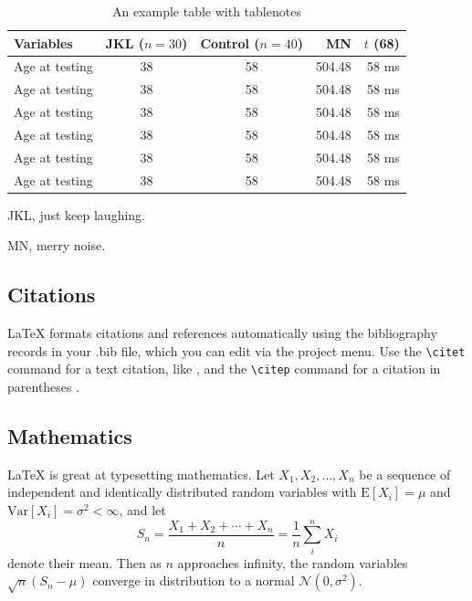 \documentclass{article}
\begin{document}
\begin{table}[hbt!]\centering
\begin{threeparttable}
\caption{An example table with tablenotes}\label{tab:withnotes}

\begin{tabular}{lccrr}
\toprule
Variables & JKL ($n=30$) & Control ($n=40$) & MN & $t$ (68)\\
\midrule
Age at testing & 38 & 58\tnote{1} & 504.48 & 58 ms\\
Age at testing & 38 & 58 & 504.48 & 58 ms\\
Age at testing & 38 & 58 & 504.48 & 58 ms\\
Age at testing & 38 & 58 & 504.48 & 58 ms\\
Age at testing\tnote{2} & 38 & 58 & 504.48 & 58 ms\\
Age at testing & 38 & 58 & 504.48 & 58 ms\\
\bottomrule
\end{tabular}
\begin{tablenotes}
\item[1] JKL, just keep laughing.
\item[2] MN, merry noise.
\end{tablenotes}
\end{threeparttable}
\end{table}

\subsection{Citations}

LaTeX formats citations and references automatically using the bibliography records in your .bib file, which you can edit via the project menu. Use the \verb|\citet| command for a text citation, like \citet{lees2010theoretical}, and the \verb|\citep| command for a citation in parentheses \citep{McQuilton01012012}.\cite{Bloss029983}

\subsection{Mathematics}

\LaTeX{} is great at typesetting mathematics. Let $X_1, X_2, \ldots, X_n$ be a sequence of independent and identically distributed random variables with $\text{E}[X_i] = \mu$ and $\text{Var}[X_i] = \sigma^2 < \infty$, and let
\begin{equation}\label{eq:sum}
S_n = \frac{X_1 + X_2 + \cdots + X_n}{n}
      = \frac{1}{n}\sum_{i}^{n} X_i
\end{equation}
denote their mean. Then as $n$ approaches infinity, the random variables $\sqrt{n}(S_n - \mu)$ converge in distribution to a normal $\mathcal{N}(0, \sigma^2)$.
\end{document}
